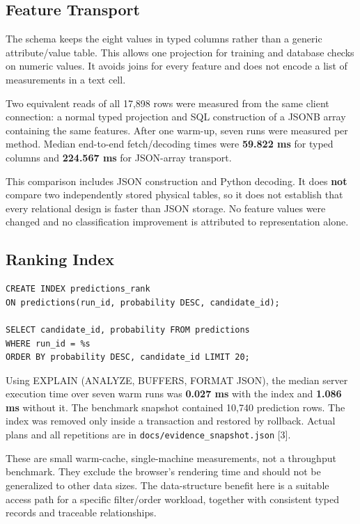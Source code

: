 \documentclass[11pt,a4paper]{article}
\begin{document}
\subsection{Feature Transport}
The schema keeps the eight values in typed columns rather than a generic attribute/value table. This allows one projection for training and database checks on numeric values. It avoids joins for every feature and does not encode a list of measurements in a text cell.

Two equivalent reads of all 17,898 rows were measured from the same client connection: a normal typed projection and SQL construction of a JSONB array containing the same features. After one warm-up, seven runs were measured per method. Median end-to-end fetch/decoding times were \textbf{59.822 ms} for typed columns and \textbf{224.567 ms} for JSON-array transport.

This comparison includes JSON construction and Python decoding. It does \textbf{not} compare two independently stored physical tables, so it does not establish that every relational design is faster than JSON storage. No feature values were changed and no classification improvement is attributed to representation alone.

\subsection{Ranking Index}
\begin{verbatim}
CREATE INDEX predictions_rank
ON predictions(run_id, probability DESC, candidate_id);

SELECT candidate_id, probability FROM predictions
WHERE run_id = %s
ORDER BY probability DESC, candidate_id LIMIT 20;
\end{verbatim}
Using EXPLAIN (ANALYZE, BUFFERS, FORMAT JSON), the median server execution time over seven warm runs was \textbf{0.027 ms} with the index and \textbf{1.086 ms} without it. The benchmark snapshot contained 10,740 prediction rows. The index was removed only inside a transaction and restored by rollback. Actual plans and all repetitions are in \texttt{docs/evidence\_snapshot.json} [3].

These are small warm-cache, single-machine measurements, not a throughput benchmark. They exclude the browser's rendering time and should not be generalized to other data sizes. The data-structure benefit here is a suitable access path for a specific filter/order workload, together with consistent typed records and traceable relationships.
\end{document}
